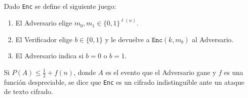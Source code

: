 \documentclass{ayudantia}
\begin{document}
\begin{defn}
    Dado \texttt{Enc} se define el siguiente juego:
    \begin{enumerate}
        \item El Adversario elige \(m_0,m_1\in\{0,1\}^{\ell(n)}\).
        \item El Verificador elige \(b\in\{0,1\}\) y le devuelve a \(\texttt{Enc}(k,m_b)\) al Adversario.
        \item El Adversario indica si \(b=0\) o \(b=1\).
    \end{enumerate}
    Si \(P(A)\leq\frac12+f(n)\), donde \(A\) es el evento que el Adversario gane y \(f\) es una función despreciable, se dice que \texttt{Enc} es un cifrado indistinguible ante un ataque de texto cifrado.
\end{defn}
\end{document}
